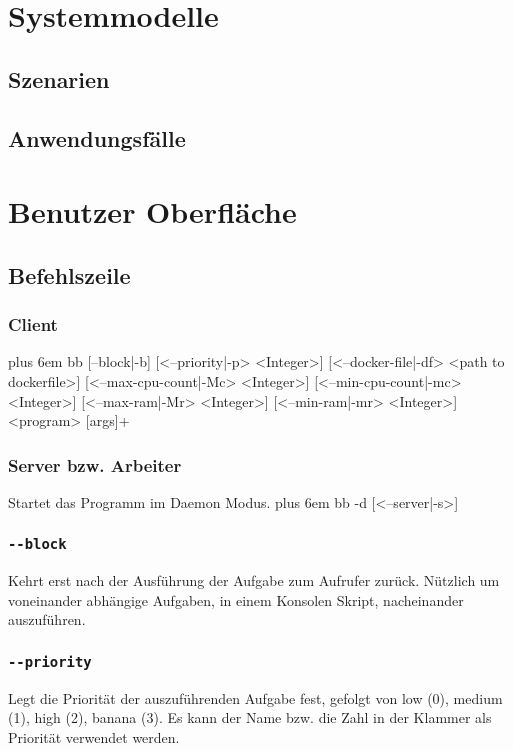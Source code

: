 \documentclass[a4paper,12pt]{article}
\makeatletter
\newenvironment{mycode}
 {\def\@xobeysp{\ }\verbatim\rightskip=0pt plus 6em\relax}
 {\endverbatim}
\makeatother
\begin{document}
\section{Systemmodelle}

\subsection{Szenarien}

\subsection{Anwendungsfälle}

\section{Benutzer Oberfläche}
\subsection{Befehlszeile}
\subsubsection{Client}
\begin{mycode}
bb [--block|-b] [<--priority|-p> <Integer>] [<--docker-file|-df> <path to dockerfile>] [<--max-cpu-count|-Mc> <Integer>] [<--min-cpu-count|-mc> <Integer>] [<--max-ram|-Mr> <Integer>] [<--min-ram|-mr> <Integer>] <program> [args]+
\end{mycode}

\subsubsection{Server bzw. Arbeiter}
Startet das Programm im \gls{Daemon} Modus.
\begin{mycode}
bb -d [<--server|-s>]
\end{mycode}

\subsubsection{\texttt{-{}-block}}
Kehrt erst nach der Ausführung der Aufgabe zum Aufrufer zurück. Nützlich um voneinander abhängige Aufgaben, in einem Konsolen Skript, nacheinander auszuführen.

\subsubsection{\texttt{-{}-priority}}
Legt die Priorität der auszuführenden Aufgabe fest, gefolgt von low (0), medium (1), high (2), banana (3).
Es kann der Name bzw. die Zahl in der Klammer als Priorität verwendet werden.
\end{document}
